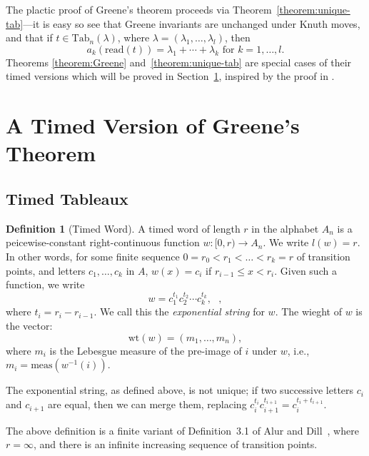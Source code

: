 \documentclass[10pt]{amsproc}
\theoremstyle{definition}
\newtheorem{definition}[theorem]{Definition}
\theoremstyle{remark}
\newcommand{\Tab}{\mathrm{Tab}}
\newcommand{\rd}{\mathrm{read}}
\newcommand{\wt}{\mathrm{wt}}
\begin{document}
The plactic proof of Greene's theorem proceeds via Theorem~\ref{theorem:unique-tab}---it is easy so see that Greene invariants are unchanged under Knuth moves, and that if $t\in \Tab_n(\lambda)$, where $\lambda=(\lambda_1,\dotsc,\lambda_l)$, then
\begin{displaymath}
  a_k(\rd(t)) = \lambda_1+\dotsb +\lambda_k\text{ for }k=1,\dotsc,l.
\end{displaymath}
Theorems \ref{theorem:Greene} and~\ref{theorem:unique-tab} are special cases of their timed versions which will be proved in Section~\ref{sec:timed-vers-green}, inspired by the proof in \cite{Lascoux}.
\section{A Timed Version of Greene's Theorem}
\label{sec:timed-vers-green}
\subsection{Timed Tableaux}
\label{sec:timed-tableaux}
\begin{definition}
  [Timed Word]
  \label{definition:timed-word}
  A timed word of length $r$ in the alphabet $A_n$ is a peicewise-constant right-continuous function $w:[0,r)\to A_n$.
  We write $l(w)=r$.
  In other words, for some finite sequence $0=r_0<r_1<\dotsc<r_k=r$ of transition points, and letters $c_1,\dotsc, c_k$ in $A$, $w(x) = c_i$ if $r_{i-1}\leq x < r_i$.
  Given such a function, we write
  \begin{equation}
    \label{eq:exp_not}
    w = c_1^{t_1} c_2^{t_2}\dotsb c_k^{t_k}, \text{ },
  \end{equation}
  where $t_i = r_i-r_{i-1}$.
  We call this the \emph{exponential string} for $w$.
  The wieght of $w$ is the vector:
  \begin{displaymath}
    \wt(w) = (m_1,\dotsc,m_n),
  \end{displaymath}
  where $m_i$ is the Lebesgue measure of the pre-image of $i$ under $w$, i.e., $m_i=\mathrm{meas}(w^{-1}(i))$.
\end{definition}
The exponential string, as defined above, is not unique; if two successive letters $c_i$ and $c_{i+1}$ are equal, then we can merge them, replacing $c_i^{t_i}c_{i+1}^{t_{i+1}} = c_i^{t_i+t_{i+1}}$.

The above definition is a finite variant of Definition~3.1 of Alur and Dill~\cite{alur-dill}, where $r=\infty$, and there is an infinite increasing sequence of transition points.
\end{document}
